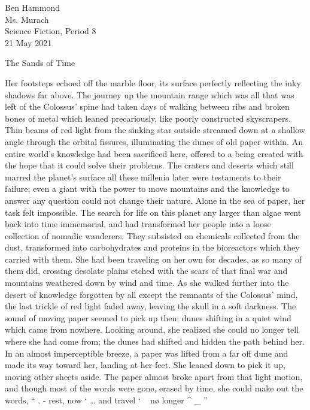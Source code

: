\documentclass[12pt]{article}
\begin{document}
\begin{flushleft}

Ben Hammond\\
Ms. Murach\\
Science Fiction, Period 8\\
21 May 2021\\


\begin{center}
The Sands of Time
\end{center}


\setlength{\parindent}{0.5in}

Her footsteps echoed off the marble floor, its surface perfectly reflecting the inky shadows far above. The journey up the mountain range which was all that was left of the Colossus’ spine had taken days of walking between ribs and broken bones of metal which leaned precariously, like poorly constructed skyscrapers. Thin beams of red light from the sinking star outside streamed down at a shallow angle through the orbital fissures, illuminating the dunes of old paper within. An entire world’s knowledge had been sacrificed here, offered to a being created with the hope that it could solve their problems. The craters and deserts which still marred the planet’s surface all these millenia later were testaments to their failure; even a giant with the power to move mountains and the knowledge to answer any question could not change their nature. 
​Alone in the sea of paper, her task felt impossible. The search for life on this planet any larger than algae went back into time immemorial, and had transformed her people into a loose collection of nomadic wanderers. They subsisted on chemicals collected from the dust, transformed into carbohydrates and proteins in the bioreactors which they carried with them. She had been traveling on her own for decades, as so many of them did, crossing desolate plains etched with the scars of that final war and mountains weathered down by wind and time. 
​As she walked further into the desert of knowledge forgotten by all except the remnants of the Colossus' mind, the last trickle of red light faded away, leaving the skull in a soft darkness. The sound of moving paper seemed to pick up then; dunes shifting in a quiet wind which came from nowhere. Looking around, she realized she could no longer tell where she had come from; the dunes had shifted and hidden the path behind her. In an almost imperceptible breeze, a paper was lifted from a far off dune and made its way toward her, landing at her feet. She leaned down to pick it up, moving other sheets aside. The paper almost broke apart from that light motion, and though most of the words were gone, erased by time, she could make out the words, “   .  -  rest, now    `     …  and travel   ‘       ~ nø longer   ^  _    ”

\end{flushleft}
\end{document}
